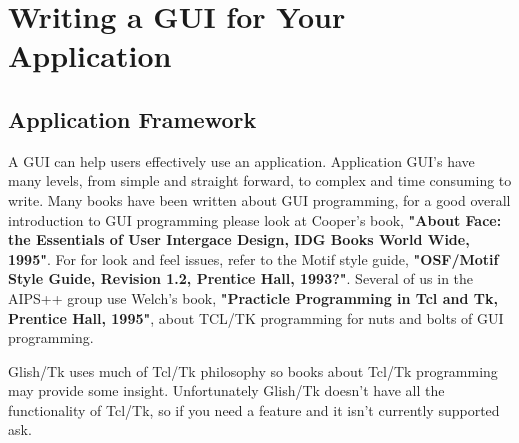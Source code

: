 \section{Writing a GUI for Your Application}
\label{sec:gui}

\subsection{Application Framework}
A GUI can help users effectively use an
application.  Application GUI's have many levels, from simple and straight
forward, to complex and time consuming to write.  Many books have been written
about GUI
programming, for a good overall introduction to GUI programming please look at
Cooper's book, \textbf{"About Face: the Essentials of User Intergace Design,
IDG Books World Wide, 1995"}. For for look and feel issues, refer to the Motif
style guide, \textbf{"OSF/Motif Style Guide, Revision 1.2, Prentice Hall, 1993?"}. 
Several of us in the AIPS++ group use
Welch's book, \textbf{"Practicle Programming in Tcl and Tk, Prentice Hall, 1995"},
about TCL/TK programming for nuts and bolts of 
GUI programming.

Glish/Tk uses much of Tcl/Tk philosophy so books
about Tcl/Tk programming may provide some insight.  Unfortunately Glish/Tk
doesn't have all the functionality of Tcl/Tk, so if you need a feature and
it isn't currently supported ask.
